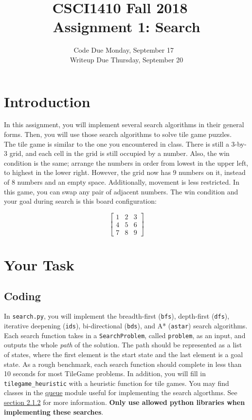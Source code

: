 \documentclass{article}
\title{CSCI1410 Fall 2018 ~\\
Assignment 1: Search}
\date{Code Due Monday, September 17 ~\\
Writeup Due Thursday, September 20}
\begin{document}
\maketitle

\section{Introduction}
In this assignment, you will implement several search algorithms in their general forms.
Then, you will use those search algorithms to solve tile game puzzles. ~\\

The tile game is similar to the one you encountered in class.
There is still a 3-by-3 grid,
and each cell in the grid is still occupied by a number.
Also, the win condition is the same;
arrange the numbers in order from lowest in the upper left, to highest in the lower right.
However, the grid now has 9 numbers on it, instead of 8 numbers and an empty space.
Additionally, movement is less restricted.
In this game, you can swap any pair of adjacent
numbers.
The win condition and your goal during search is this board configuration:

\[
\begin{bmatrix}
1 & 2 & 3 \\
4 & 5 & 6 \\
7 & 8 & 9
\end{bmatrix}
\]

\section{Your Task}
\subsection{Coding}
In \verb|search.py|, you will implement the breadth-first (\verb|bfs|), depth-first (\verb|dfs|), iterative deepening (\verb|ids|), bi-directional (\verb|bds|), and A* (\verb|astar|) search algorithms.
Each search function takes in a \verb|SearchProblem|, called \verb|problem|, as an input, and outputs the whole \textit{path} of the solution.
The path should be represented as a list of states, where the first element is the start state and the last element is a goal state.
As a rough benchmark, each search function should complete in less than 10 seconds for most TileGame problems.
In addition, you will fill in \verb|tilegame_heuristic| with a heuristic function for tile games.
You may find classes in the \href{https://docs.python.org/3/library/queue.html}{queue} module useful for implementing the search algorthms. See \hyperref[sec:queue]{section 2.1.2} for more information.
\textbf{Only use allowed python libraries when implementing these searches}.
\end{document}
